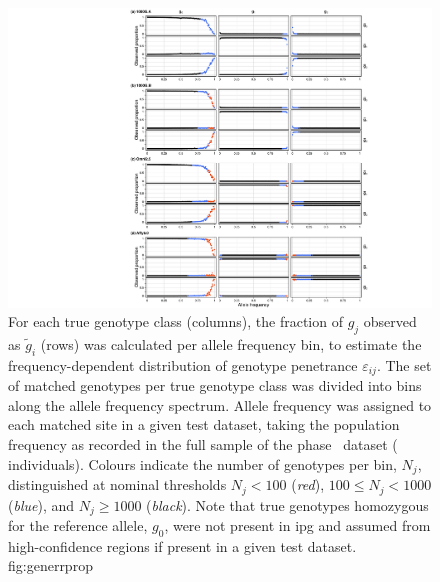 

\begin{figure}[!htbp]
\includegraphics[width=\textwidth]{./img/ch4/generrprop}
%
{For each true genotype class (columns), the fraction of $g_j$ observed as $\tilde{g}_i$ (rows) was calculated per allele frequency bin, to estimate the frequency-dependent distribution of genotype penetrance $\varepsilon_{ij}$.
The set of matched genotypes per true genotype class was divided into  bins along the allele frequency spectrum.
Allele frequency was assigned to each matched site in a given test dataset, taking the population frequency as recorded in the full sample of the  phase~ dataset ( individuals).
Colours indicate the number of genotypes per bin, $N_{j}$, distinguished at nominal thresholds ${N_j < 100}$ (\emph{red}), ${100 \leq N_j < 1000}$ (\emph{blue}), and ${N_j \geq 1000}$ (\emph{black}).
Note that true genotypes homozygous for the reference allele, $g_0$, were not present in \gls{ipg} and assumed from high-confidence regions if present in a given test dataset.\CorrectLabel}%
{fig:generrprop}
\end{figure}
